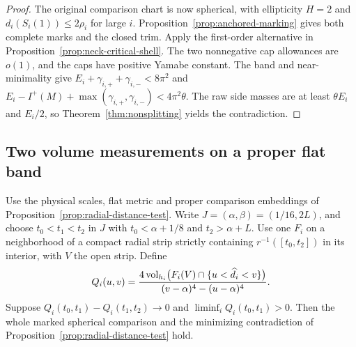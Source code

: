 \begin{proof}
The original comparison chart is now spherical, with
ellipticity \(H=2\) and \(d_i(S_i(1))\le2\rho_i\) for large
\(i\). Proposition~\ref{prop:anchored-marking} gives both
complete marks and the closed trim. Apply the first-order
alternative in Proposition~\ref{prop:neck-critical-shell}.
The two nonnegative cap allowances are \(o(1)\), and the
caps have positive Yamabe constant. The band and near-minimality
give \(E_i+\gamma_{i,+}+\gamma_{i,-}<8\pi^2\) and
\(E_i-I^+(M)+\max(\gamma_{i,+},\gamma_{i,-})<4\pi^2\theta\).
The raw side masses are at least \(\theta E_i\) and \(E_i/2\),
so Theorem~\ref{thm:nonsplitting} yields the contradiction.
\end{proof}

\subsection{Two volume measurements on a proper flat band}

\begin{proposition}\label{prop:radial-volume-test}
Use the physical scales, flat metric and proper comparison
embeddings of Proposition~\ref{prop:radial-distance-test}.
Write \(J=(\alpha,\beta)=(1/16,2L)\), and choose
\(t_0<t_1<t_2\) in \(J\) with \(t_0<\alpha+1/8\) and
\(t_2>\alpha+L\). Use one \(F_i\) on a neighborhood of
a compact radial strip strictly containing \(r^{-1}([t_0,t_2])\)
in its interior, with \(V\) the open strip. Define
\[
 Q_i(u,v)=
 \frac{4\operatorname{vol}_{h_i}\bigl(F_i(V)\cap\{u<\widehat d_i<v\}\bigr)}
      {(v-\alpha)^4-(u-\alpha)^4}.
\]
Suppose \(Q_i(t_0,t_1)-Q_i(t_1,t_2)\to0\) and
\(\liminf_i Q_i(t_0,t_1)>0\). Then the whole marked
spherical comparison and the minimizing contradiction of
Proposition~\ref{prop:radial-distance-test} hold.
\end{proposition}

